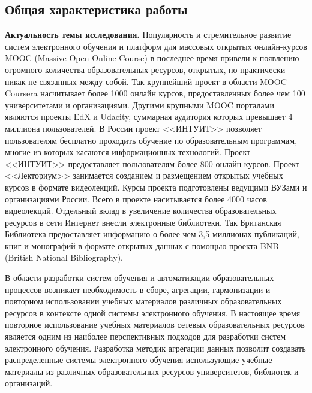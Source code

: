 \subsection*{\Large Общая характеристика работы}
\fontsize{14pt}{15pt}\selectfont


\textbf{Актуальность темы исследования.}
Популярность и стремительное развитие систем электронного обучения и платформ для массовых открытых онлайн-курсов MOOC (Massive Open Online Course) в последнее время привели к появлению огромного количества образовательных ресурсов, открытых, но практически никак не связанных между собой. Так крупнейший проект в области MOOC - Coursera насчитывает более 1000 онлайн курсов, предоставленных более чем 100 университетами и организациями. Другими крупными MOOC порталами являются проекты EdX и Udacity, суммарная аудитория которых превышает 4 миллиона пользователей. В России проект <<ИНТУИТ>> позволяет пользователям бесплатно проходить обучение по образовательным программам, многие из которых касаются информационных технологий. Проект <<ИНТУИТ>> предоставляет пользователям более 800 онлайн курсов. Проект <<Лекториум>> занимается созданием и размещением открытых учебных курсов в формате видеолекций. Курсы проекта подготовлены ведущими ВУЗами и организациями России. Всего в проекте наситывается более 4000 часов видеолекций. Отдельный вклад в увеличение количества образовательных ресурсов в сети Интернет внесли электронные библиотеки. Так Британская Библиотека предоставляет информацию о более чем 3,5 миллионах публикаций, книг и монографий в формате открытых данных с помощью проекта BNB (British National Bibliography). 

В области разработки систем обучения и автоматизации образовательных процессов возникает необходимость в сборе, агрегации, гармонизации и повторном использовании учебных материалов различных образовательных ресурсов в контексте одной системы электронного обучения. В настоящее время повторное использование учебных материалов сетевых образовательных ресурсов является одним из наиболее перспективных подходов для разработки систем электронного обучения. Разработка методик агрегации данных позволит создавать распределенные системы электронного обучения использующие учебные материалы из различных образовательных ресурсов университетов, библиотек и организаций.

